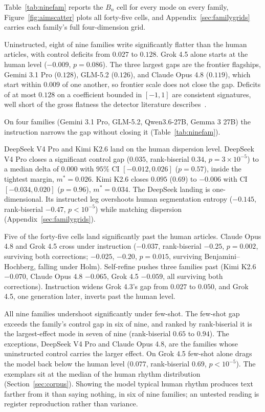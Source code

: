 \documentclass{article}
\begin{document}
Table~\ref{tab:ninefam} reports the $B_n$ cell for every mode on every family,
Figure~\ref{fig:aimscatter} plots all forty-five cells, and
Appendix~\ref{sec:familygrids} carries each family's full four-dimension grid.

Uninstructed, eight of nine families write significantly flatter than the human articles,
with control deficits from $0.027$ to $0.128$. Grok 4.5 alone starts at the human level
($-0.009$, $p=0.086$). The three largest gaps are the frontier flagships, Gemini 3.1 Pro
($0.128$), GLM-5.2 ($0.126$), and Claude Opus 4.8 ($0.119$), which start within $0.009$ of
one another, so frontier scale does not close the gap.
Deficits of at most $0.128$ on a coefficient bounded in $[-1,1]$ are consistent signatures,
well short of the gross flatness the detector literature describes~\citep{arxiv2024detecting, arxiv2025detecting}.

On four families (Gemini 3.1 Pro, GLM-5.2, Qwen3.6-27B, Gemma 3 27B) the instruction narrows
the gap without closing it (Table~\ref{tab:ninefam}).

DeepSeek V4 Pro and Kimi K2.6 land on the human dispersion level. DeepSeek V4 Pro closes a significant control gap
($0.035$, rank-biserial $0.34$, $p=3\times10^{-5}$) to a median delta of $0.000$ with $95\%$ CI
$[-0.012, 0.026]$ ($p=0.57$), inside the tightest margin, $m^{*}=0.026$. Kimi K2.6 closes
$0.095$ ($0.69$) to $-0.006$ with CI $[-0.034, 0.020]$ ($p=0.96$), $m^{*}=0.034$.
The DeepSeek landing is one-dimensional. Its instructed leg overshoots human segmentation
entropy ($-0.145$, rank-biserial $-0.47$, $p<10^{-5}$) while matching dispersion
(Appendix~\ref{sec:familygrids}).

Five of the forty-five cells land significantly past the human articles. Claude Opus 4.8 and
Grok 4.5 cross under instruction ($-0.037$, rank-biserial $-0.25$, $p=0.002$, surviving both
corrections; $-0.025$, $-0.20$, $p=0.015$, surviving Benjamini--Hochberg, falling under Holm).
Self-refine pushes three families past (Kimi K2.6 $-0.070$, Claude Opus 4.8 $-0.065$,
Grok 4.5 $-0.059$, all surviving both corrections). Instruction widens Grok 4.3's gap from
$0.027$ to $0.050$, and Grok 4.5, one generation later, inverts past the human level.

All nine families undershoot significantly under few-shot. The few-shot gap exceeds the
family's control gap in six of nine, and ranked by rank-biserial it is the largest-effect
mode in seven of nine (rank-biserial $0.65$ to $0.94$). The exceptions,
DeepSeek V4 Pro and Claude Opus 4.8, are the families whose uninstructed control carries
the larger effect. On Grok 4.5 few-shot alone drags the model back below the human level
($0.077$, rank-biserial $0.69$, $p<10^{-5}$). The exemplars sit at the median of the human
rhythm distribution (Section~\ref{sec:corpus}). Showing the model
typical human rhythm produces text farther from it than saying nothing, in six of nine
families; an untested reading is register reproduction rather than variance.
\end{document}
